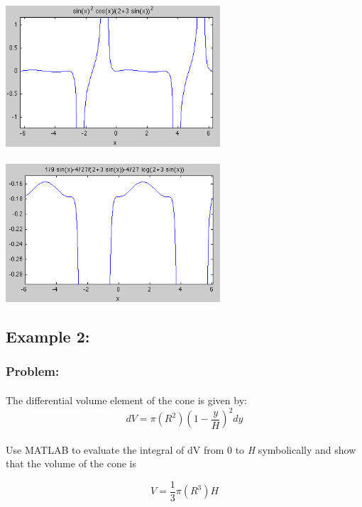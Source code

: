 \documentclass[]{article}
\begin{document}
\begin{center}
\includegraphics[width=8cm]{P1function}

\end{center}
\paragraph{}
\begin{center}
\includegraphics[width=8cm]{P1integral}
\end{center}

\subsection{Example 2:}
\subsubsection{Problem:}
\paragraph{}
The differential volume element of the cone is given by:
\[
dV=\pi(R^2)(1-\frac{y}{H})^2dy
\]
\paragraph{}
Use MATLAB to evaluate the integral of dV from 0 to \emph{H} symbolically and show that the volume of the cone is 

\[
V=\frac{1}{3}\pi(R^3)H
\]
\end{document}
